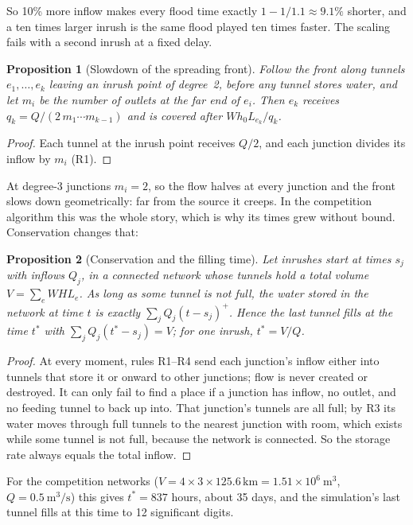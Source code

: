 \documentclass[11pt,a4paper]{article}
\newtheorem{proposition}{Proposition}
\theoremstyle{remark}
\begin{document}
So 10\% more inflow makes every flood time exactly $1-1/1.1 \approx 9.1\%$ shorter, and a ten times larger inrush is the same flood played ten times faster. The scaling fails with a second inrush at a fixed delay.

\begin{proposition}[Slowdown of the spreading front]
Follow the front along tunnels $e_1,\dots,e_k$ leaving an inrush point of degree~2, before any tunnel stores water, and let $m_i$ be the number of outlets at the far end of $e_i$. Then $e_k$ receives $q_k = Q/(2\,m_1\cdots m_{k-1})$ and is covered after $W h_0 L_{e_k}/q_k$.
\end{proposition}
\begin{proof}
Each tunnel at the inrush point receives $Q/2$, and each junction divides its inflow by $m_i$ (R1).
\end{proof}

At degree-3 junctions $m_i=2$, so the flow halves at every junction and the front slows down geometrically: far from the source it creeps. In the competition algorithm this was the whole story, which is why its times grew without bound. Conservation changes that:

\begin{proposition}[Conservation and the filling time]
Let inrushes start at times $s_j$ with inflows $Q_j$, in a connected network whose tunnels hold a total volume $V = \sum_e W H L_e$. As long as some tunnel is not full, the water stored in the network at time $t$ is exactly $\sum_j Q_j (t-s_j)^+$. Hence the last tunnel fills at the time $t^*$ with $\sum_j Q_j (t^*-s_j) = V$; for one inrush, $t^* = V/Q$.
\end{proposition}
\begin{proof}
At every moment, rules R1--R4 send each junction's inflow either into tunnels that store it or onward to other junctions; flow is never created or destroyed. It can only fail to find a place if a junction has inflow, no outlet, and no feeding tunnel to back up into. That junction's tunnels are all full; by R3 its water moves through full tunnels to the nearest junction with room, which exists while some tunnel is not full, because the network is connected. So the storage rate always equals the total inflow.
\end{proof}

For the competition networks ($V = 4\times 3 \times 125.6\,\mathrm{km} = 1.51\times10^6\ \mathrm{m^3}$, $Q = 0.5\ \mathrm{m^3/s}$) this gives $t^* = 837$ hours, about 35 days, and the simulation's last tunnel fills at this time to 12 significant digits.
\end{document}

